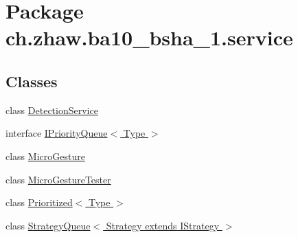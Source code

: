 \hypertarget{namespacech_1_1zhaw_1_1ba10__bsha__1_1_1service}{
\section{Package ch.zhaw.ba10\_\-bsha\_\-1.service}
\label{namespacech_1_1zhaw_1_1ba10__bsha__1_1_1service}
}
\subsection*{Classes}
\begin{DoxyCompactItemize}
\item 
class \hyperlink{classch_1_1zhaw_1_1ba10__bsha__1_1_1service_1_1DetectionService}{DetectionService}
\item 
interface \hyperlink{interfacech_1_1zhaw_1_1ba10__bsha__1_1_1service_1_1IPriorityQueue_3_01Type_01_4}{IPriorityQueue$<$ Type $>$}
\item 
class \hyperlink{classch_1_1zhaw_1_1ba10__bsha__1_1_1service_1_1MicroGesture}{MicroGesture}
\item 
class \hyperlink{classch_1_1zhaw_1_1ba10__bsha__1_1_1service_1_1MicroGestureTester}{MicroGestureTester}
\item 
class \hyperlink{classch_1_1zhaw_1_1ba10__bsha__1_1_1service_1_1Prioritized_3_01Type_01_4}{Prioritized$<$ Type $>$}
\item 
class \hyperlink{classch_1_1zhaw_1_1ba10__bsha__1_1_1service_1_1StrategyQueue_3_01Strategy_01extends_01IStrategy_01_4}{StrategyQueue$<$ Strategy extends IStrategy $>$}
\end{DoxyCompactItemize}
